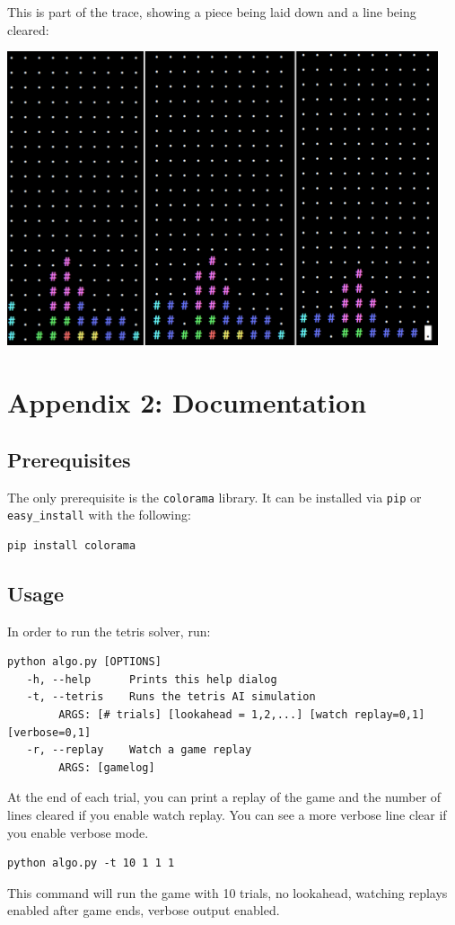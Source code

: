 \documentclass[11pt]{article}
\begin{document}
This is part of the trace, showing a piece being laid down and a line being cleared:

\includegraphics[width=5.0in]{exampleoutput.png}


\section{Appendix 2: Documentation}
\subsection{Prerequisites}
The only prerequisite is the \verb|colorama| library. It can be installed via \verb|pip| or \verb|easy_install| with the following:
\begin{verbatim}
pip install colorama
\end{verbatim}

\subsection{Usage}
In order to run the tetris solver, run:
\begin{verbatim}
python algo.py [OPTIONS]
   -h, --help      Prints this help dialog
   -t, --tetris    Runs the tetris AI simulation
        ARGS: [# trials] [lookahead = 1,2,...] [watch replay=0,1] [verbose=0,1]
   -r, --replay    Watch a game replay
        ARGS: [gamelog]
\end{verbatim}
At the end of each trial, you can print a replay of the game and the number of lines cleared if you enable watch replay. You can see a more verbose line clear if you enable verbose mode.

\begin{verbatim}
python algo.py -t 10 1 1 1
\end{verbatim}
This command will run the game with 10 trials, no lookahead, watching replays enabled after game ends, verbose output enabled.
\end{document}
